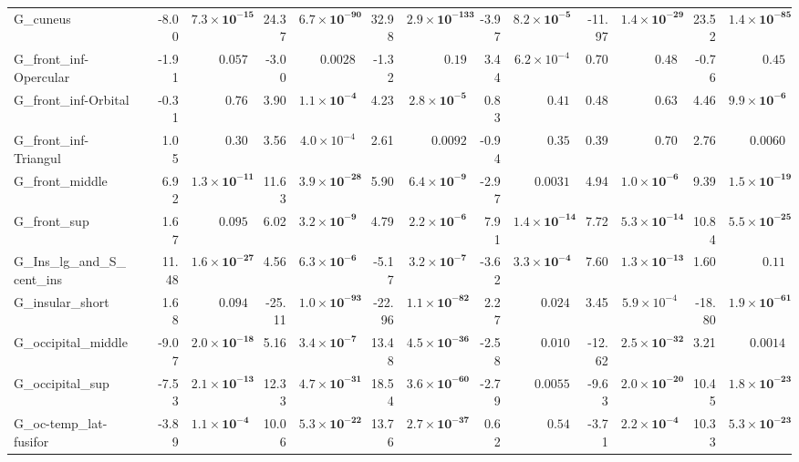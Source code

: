 {\begin{longtable}{llrrrrrrrrrrrr}
G\_cuneus &  & -8.00 & $\mathbf{7.3{\times}10^{-15}}$ & 24.37 & $\mathbf{6.7{\times}10^{-90}}$ & 32.98 & $\mathbf{2.9{\times}10^{-133}}$ & -3.97 & $\mathbf{8.2{\times}10^{-5}}$ & -11.97 & $\mathbf{1.4{\times}10^{-29}}$ & 23.52 & $\mathbf{1.4{\times}10^{-85}}$ \\
G\_front\_inf-Opercular &  & -1.91 & $0.057$ & -3.00 & $0.0028$ & -1.32 & $0.19$ & 3.44 & $6.2{\times}10^{-4}$ & 0.70 & $0.48$ & -0.76 & $0.45$ \\
G\_front\_inf-Orbital &  & -0.31 & $0.76$ & 3.90 & $\mathbf{1.1{\times}10^{-4}}$ & 4.23 & $\mathbf{2.8{\times}10^{-5}}$ & 0.83 & $0.41$ & 0.48 & $0.63$ & 4.46 & $\mathbf{9.9{\times}10^{-6}}$ \\
G\_front\_inf-Triangul &  & 1.05 & $0.30$ & 3.56 & $4.0{\times}10^{-4}$ & 2.61 & $0.0092$ & -0.94 & $0.35$ & 0.39 & $0.70$ & 2.76 & $0.0060$ \\
G\_front\_middle &  & 6.92 & $\mathbf{1.3{\times}10^{-11}}$ & 11.63 & $\mathbf{3.9{\times}10^{-28}}$ & 5.90 & $\mathbf{6.4{\times}10^{-9}}$ & -2.97 & $0.0031$ & 4.94 & $\mathbf{1.0{\times}10^{-6}}$ & 9.39 & $\mathbf{1.5{\times}10^{-19}}$ \\
G\_front\_sup &  & 1.67 & $0.095$ & 6.02 & $\mathbf{3.2{\times}10^{-9}}$ & 4.79 & $\mathbf{2.2{\times}10^{-6}}$ & 7.91 & $\mathbf{1.4{\times}10^{-14}}$ & 7.72 & $\mathbf{5.3{\times}10^{-14}}$ & 10.84 & $\mathbf{5.5{\times}10^{-25}}$ \\
G\_Ins\_lg\_and\_S\_cent\_ins &  & 11.48 & $\mathbf{1.6{\times}10^{-27}}$ & 4.56 & $\mathbf{6.3{\times}10^{-6}}$ & -5.17 & $\mathbf{3.2{\times}10^{-7}}$ & -3.62 & $\mathbf{3.3{\times}10^{-4}}$ & 7.60 & $\mathbf{1.3{\times}10^{-13}}$ & 1.60 & $0.11$ \\
G\_insular\_short &  & 1.68 & $0.094$ & -25.11 & $\mathbf{1.0{\times}10^{-93}}$ & -22.96 & $\mathbf{1.1{\times}10^{-82}}$ & 2.27 & $0.024$ & 3.45 & $5.9{\times}10^{-4}$ & -18.80 & $\mathbf{1.9{\times}10^{-61}}$ \\
G\_occipital\_middle &  & -9.07 & $\mathbf{2.0{\times}10^{-18}}$ & 5.16 & $\mathbf{3.4{\times}10^{-7}}$ & 13.48 & $\mathbf{4.5{\times}10^{-36}}$ & -2.58 & $0.010$ & -12.62 & $\mathbf{2.5{\times}10^{-32}}$ & 3.21 & $0.0014$ \\
G\_occipital\_sup &  & -7.53 & $\mathbf{2.1{\times}10^{-13}}$ & 12.33 & $\mathbf{4.7{\times}10^{-31}}$ & 18.54 & $\mathbf{3.6{\times}10^{-60}}$ & -2.79 & $0.0055$ & -9.63 & $\mathbf{2.0{\times}10^{-20}}$ & 10.45 & $\mathbf{1.8{\times}10^{-23}}$ \\
G\_oc-temp\_lat-fusifor &  & -3.89 & $\mathbf{1.1{\times}10^{-4}}$ & 10.06 & $\mathbf{5.3{\times}10^{-22}}$ & 13.76 & $\mathbf{2.7{\times}10^{-37}}$ & 0.62 & $0.54$ & -3.71 & $\mathbf{2.2{\times}10^{-4}}$ & 10.33 & $\mathbf{5.3{\times}10^{-23}}$ \\

\end{longtable}}
